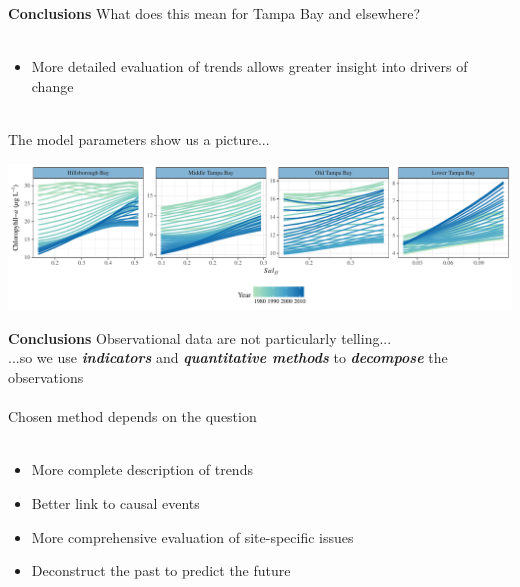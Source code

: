 \documentclass[serif]{beamer}\usepackage[]{graphicx}\usepackage[]{color}
\newcommand{\emtxt}[1]{\textbf{\textit{#1}}}
\begin{document}
\begin{frame}[t]{\textbf{Conclusions}}
\onslide<+->
What does this mean for Tampa Bay and elsewhere?\\~\\
\vspace{-0.2in}
\begin{itemize}
\item More detailed evaluation of trends allows greater insight into drivers of change\\~\\
\end{itemize}
\onslide<+->
The model parameters show us a picture...
\centerline{\includegraphics[width = \textwidth]{fig/title_plo.pdf}}
\end{frame}

\begin{frame}{\textbf{Conclusions}}
\onslide<+->
Observational data are not particularly telling... \\
...so we use \emtxt{indicators} and \emtxt{quantitative methods} to \emtxt{decompose} the observations \\~\\
\onslide<+->
Chosen method depends on the question \\~\\
\onslide<+->
\begin{itemize}
\item More complete description of trends
\item Better link to causal events
\item More comprehensive evaluation of site-specific issues
\item Deconstruct the past to predict the future\\~\\
\end{itemize}
\end{frame}
\end{document}
